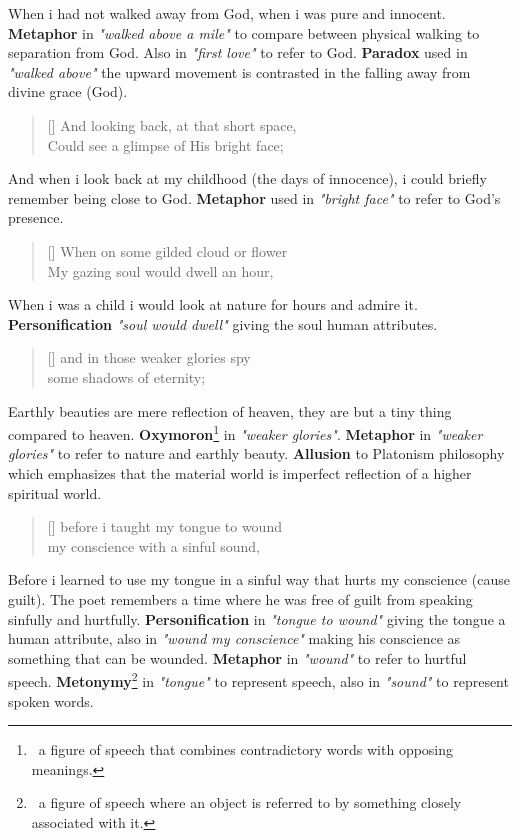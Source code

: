 \documentclass[12pt, a4paper]{article}
\begin{document}
When i had not walked away from God, when i was pure and innocent.
\textbf{Metaphor} in \textit{"walked above a mile"} to compare
between physical walking to separation from God. Also 
in \textit{"first love"} to refer to God. \textbf{Paradox} used in \textit{"walked above"}
the upward movement is contrasted in the falling away from divine grace (God).


\begin{verse}[\versewidth]
{\fontverse
And looking back, at that short space,\\
Could see a glimpse of His bright face;
} 
\end{verse}

And when i look back at my childhood (the days of innocence), i could
briefly remember being close to God. \textbf{Metaphor} used in \textit{"bright face"} 
to refer to God's presence. 

\begin{verse}[\versewidth]
{\fontverse
When on some gilded cloud or flower\\
My gazing soul would dwell an hour, 
} 
\end{verse}

When i was a child i would look at nature for hours and admire it.
\textbf{Personification} \textit{"soul would dwell"} giving the soul
human attributes. 


\begin{verse}[\versewidth]
{\fontverse
and in those weaker glories spy\\
some shadows of eternity;
} 
\end{verse}

Earthly beauties are mere reflection of heaven, they are 
but a tiny thing compared to heaven. \textbf{Oxymoron}\footnote{
\, a figure of speech that combines contradictory words with opposing meanings.}
in \textit{"weaker glories"}.
\textbf{Metaphor} in \textit{"weaker glories"} to refer to nature and earthly beauty. 
\textbf{Allusion} to Platonism philosophy which emphasizes that the material world is imperfect 
reflection of a higher spiritual world.

\begin{verse}[\versewidth]
{\fontverse
before i taught my tongue to wound\\
my conscience with a sinful sound, 
} 
\end{verse}

Before i learned to use my tongue in a sinful way that hurts
my conscience (cause guilt). The poet remembers a time where he was free of guilt 
from speaking sinfully and hurtfully. \textbf{Personification} in \textit{"tongue to wound"}
giving the tongue a human attribute, also in \textit{"wound my conscience"} making 
his conscience as something that can be wounded. \textbf{Metaphor} in \textit{"wound"} to refer
to hurtful speech. \textbf{Metonymy}\footnote{\, a figure of speech where an object 
is referred to by something closely associated with it.}
in \textit{"tongue"} to represent speech, also in \textit{"sound"} to represent spoken words.
\end{document}
